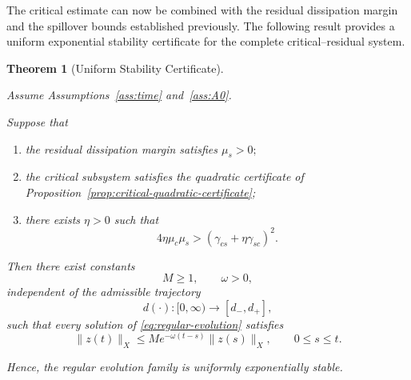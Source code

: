 \documentclass[pdflatex,sn-mathphys-num]{sn-jnl}
\theoremstyle{thmstyleone}%
\newtheorem{theorem}{Theorem}%
\theoremstyle{thmstyletwo}%
\theoremstyle{thmstylethree}%
\begin{document}
The critical estimate can now be combined with the residual dissipation margin and the spillover bounds established previously. The following result provides a uniform exponential stability certificate for the complete critical--residual system.

\begin{theorem}[Uniform Stability Certificate]
\label{thm:critical-residual-certificate}

Assume Assumptions~\ref{ass:time} and~\ref{ass:A0}.

Suppose that

\begin{enumerate}

\item
the residual dissipation margin satisfies
\(
\mu_s>0;
\)

\item
the critical subsystem satisfies the quadratic certificate of
Proposition~\ref{prop:critical-quadratic-certificate};

\item
there exists
\(
\eta>0
\)
such that
\begin{equation}
4\eta\mu_c\mu_s
>
\left(
\gamma_{cs}
+
\eta\gamma_{sc}
\right)^2.
\label{eq:small-gain-condition}
\end{equation}

\end{enumerate}

Then there exist constants
\[
M\ge1,
\qquad
\omega>0,
\]
independent of the admissible trajectory
\[
d(\cdot):[0,\infty)\rightarrow[d_-,d_+],
\]
such that every solution of
\eqref{eq:regular-evolution}
satisfies
\begin{equation}
\|z(t)\|_X
\le
Me^{-\omega(t-s)}
\|z(s)\|_X,
\qquad
0\le s\le t.
\label{eq:uniform-global-decay}
\end{equation}

Hence, the regular evolution family is uniformly exponentially stable.

\end{theorem}
\end{document}

